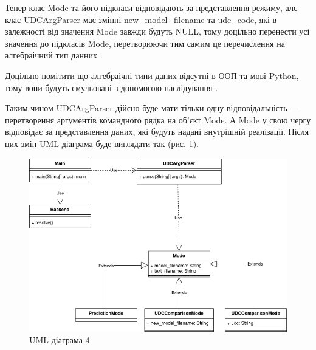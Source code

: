 \documentclass[14pt]{extarticle}
\begin{document}
  Тепер клас Mode та його підкласи відповідають за представлення режиму,
  алє клас UDCArgParser має змінні new\_model\_filename та udc\_code,
  які в залежності від значення Mode завжди будуть NULL,
  тому доцільно перенести усі значення до підкласів Mode,
  перетворюючи тим самим це перечислення на алгебраічний тип данних
  \cite{ADT_wiki}.
  
  Доцільно помітити що алгебраічні типи даних відсутні в ООП та мові Python,
  тому вони будуть ємульовані з допомогою наслідування
  \cite{Code_complete_34_4, ADT_composition_over_inheritance}.
  
  Таким чином UDCArgParser дійсно буде мати тільки одну відповідальність ---
  перетворення аргументів командного рядка на об'єкт Mode.
  А Mode у свою чергу відповідає за представлення даних,
  які будуть надані внутрішній реалізації.
  Після цих змін UML-діаграма буде виглядати так (рис. \ref{fig:io_uml4}).

  \begin{figure}[H]
    \centering
    \includegraphics[width=\textwidth]{io_uml4.drawio.png}    
    \caption{UML-діаграма 4}
    \label{fig:io_uml4}
  \end{figure}
  
\end{document}

